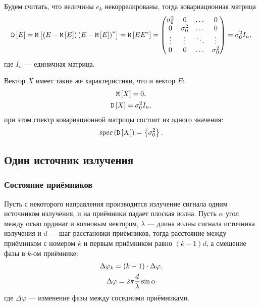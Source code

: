 Будем считать, что величины $e_k$ некоррелированы, тогда ковариационная матрица
\[
    \mathtt{D} \left [ E \right ]
    = \mathtt{M} \left [ \left( E - \mathtt{M} \left [ E \right ] \right) \left( E - \mathtt{M} \left [ E \right ] \right)^* \right ]
    = \mathtt{M} \left [ E E^* \right ]
    = \begin{pmatrix}
          \sigma_0^2 & 0          & \dots  & 0          \\
          0          & \sigma_0^2 & \dots  & 0          \\
          \vdots     & \vdots     & \ddots & \vdots     \\
          0          & 0          & \dots  & \sigma_0^2
    \end{pmatrix}
    = \sigma_0^2 I_n ,
\]
где $I_n$ --- единичная матрица.

Вектор $X$ имеет такие же характеристики, что и вектор $E$:
\begin{gather*}
    \mathtt{M} \left [ X \right ] = 0, \\
    \mathtt{D} \left [ X \right ] = \sigma_0^2 I_n ,
\end{gather*}
при этом спектр ковариационной матрицы состоит из одного значения:
\[
    spec \left ( \mathtt{D} \left [ X \right ] \right ) = \left \{ \sigma_0^2 \right \}.
\]

\subsection{Один источник излучения}

\subsubsection{Состояние приёмников}

Пусть с некоторого направления производится излучение сигнала одним источником излучения, и на приёмники падает плоская волна. Пусть $\alpha$
угол между осью ординат и волновым вектором, $\lambda$ --- длина волны сигнала источника излучения и $d$ --- шаг расстановки приёмников, тогда расстояние между
приёмником с номером $k$ и первым приёмником равно $(k-1) d$, а смещение фазы в $k$-ом приёмнике:
\begin{gather}
    \Delta \varphi_k
    = (k-1) \cdot \Delta \varphi, \notag \\
    \Delta \varphi
    = 2 \pi \frac{d}{\lambda} \sin \alpha
    \label{jammers:single:phase_shift}
\end{gather}
где $\Delta \varphi$ --- изменение фазы между соседними приёмниками.

